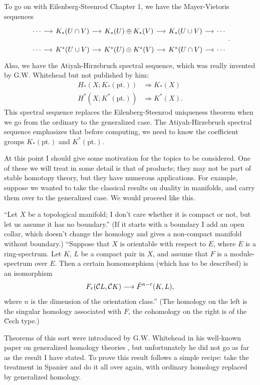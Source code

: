 \documentclass[../main]{subfiles}
\begin{document}
To go on with Eilenberg-Steenrod Chapter 1, we have the Mayer-Vietoris sequences
\[ 
    \begin{tikzcd}[column sep=small, row sep=small]
        \cdots \arrow[r] & K_*(U \cap V) \arrow[r] & K_*(U) \oplus K_*(V) \arrow[r] & K_*(U \cup V) \arrow[r] & \cdots\\
        \cdots \arrow[r] & K^*(U \cup V) \arrow[r] & K^*(U) \oplus K^*(V) \arrow[r] & K^*(U \cap V) \arrow[r] & \cdots
    \end{tikzcd}.
\] 
Also, we have the Atiyah-Hirzebruch spectral sequence, which was really invented by G.W. Whitehead but not published by him:
\begin{align*}
    H_*(X; K_*(\mathrm{pt.})) &\Longrightarrow K_*(X) \\
    H^*(X; K^*(\mathrm{pt.})) &\Longrightarrow K^*(X).
\end{align*}
This spectral sequence replaces the Eilenberg-Steenrod uniqueness theorem when we go from the ordinary to the generalized case. The Atiyah-Hirzebruch spectral sequence emphasizes that before computing, we need to know the coefficient groups $K_*(\mathrm{pt.})$ and $K^*(\mathrm{pt.})$.

At this point I should give some motivation for the topics to be considered. One of these we will treat in some detail is that of products; they may not be part of stable homotopy theory, but they have numerous applications. For example, suppose we wanted to take the classical results on duality in manifolds, and carry them over to the generalized case. We would proceed like this.

``Let $X$ be a topological manifold; I don't care whether it is compact or not, but let us assume it has no boundary.'' (If it starts with a boundary I add an open collar, which doesn't change the homology and gives a non-compact manifold without boundary.) ``Suppose that $X$ is orientable with respect to $E$, where $E$ is a ring-spectrum. Let $K$, $L$ be a compact pair in $X$, and assume that $F$ is a module-spectrum over $E$. Then a certain homomorphism (which has to be described) is an isomorphism
\[ F_r(\mathcal C L, \mathcal C K) \lra \Breve{F}^{n - r}(K, L), \]
where $n$ is the dimension of the orientation class.'' (The homology on the left is the singular homology associated with $F$, the cohomology on the right is of the \u Cech type.)

Theorems of this sort were introduced by G.W. Whitehead in his well-known paper on generalized homology theories \cite{whitehead}, but unfortunately he did not go as far as the result I have stated. To prove this result follows a simple recipe: take the treatment in Spanier and do it all over again, with ordinary homology replaced by generalized homology.
\end{document}
